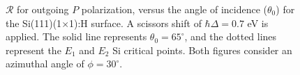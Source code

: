 \begin{figure}[H]
\centering
{}\hfill
{}
\caption[Overview of the angular dependence of $\mathcal{R}_{\mathrm{iP}}$.]
{$\mathcal{R}$ for outgoing $P$ polarization, versus the angle of
incidence ($\theta_{0}$) for the Si(111)(1$\times$1):H surface. A scissors shift
of $\hbar\Delta = 0.7$ eV is applied. The solid line represents $\theta_{0} =
65^{\circ}$, and the dotted lines represent the $E_{1}$ and $E_{2}$ Si critical
points. Both figures consider an azimuthal angle of $\phi = 30^{\circ}$.}
\label{fig:1x1rP3d}
\end{figure}

